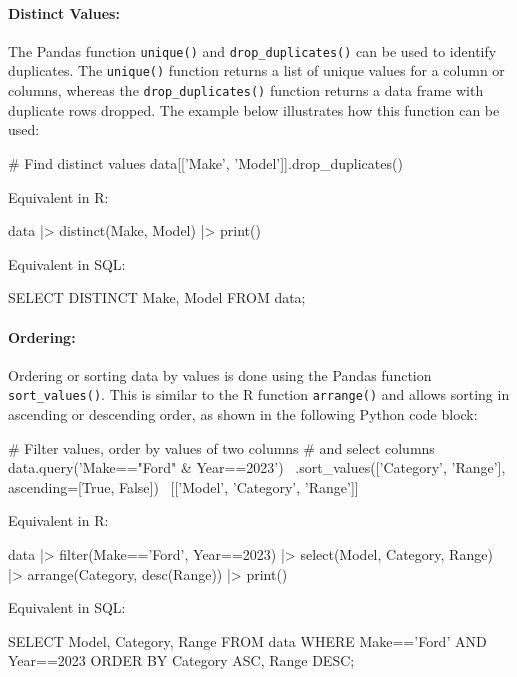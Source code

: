 \paragraph*{Distinct Values:} The Pandas function \texttt{unique()} and \texttt{drop\_duplicates()} can be used to identify duplicates. The \texttt{unique()} function returns a list of unique values for a column or columns, whereas the \texttt{drop\_duplicates()} function returns a data frame with duplicate rows dropped. The example below illustrates how this function can be used:

\begin{pythoncode}
# Find distinct values
data[['Make', 'Model']].drop_duplicates()
\end{pythoncode}

\begin{multicols}{2}

Equivalent in R:

\begin{Rcode}
data |> 
  distinct(Make, Model) |>
  print()
\end{Rcode}

Equivalent in SQL:

\begin{sqlcode}
SELECT DISTINCT Make, Model 
  FROM data;
\end{sqlcode}
\end{multicols}

\paragraph*{Ordering:} Ordering or sorting data by values is done using the Pandas function \texttt{sort\_values()}. This is similar to the R function \texttt{arrange()} and allows sorting in ascending or descending order, as shown in the following Python code block:

\begin{pythoncode}
# Filter values, order by values of two columns
# and select columns
data.query('Make=="Ford" & Year==2023') \
    .sort_values(['Category', 'Range'], ascending=[True, False]) \
    [['Model', 'Category', 'Range']]
\end{pythoncode}

\begin{multicols}{2}
Equivalent in R:
\begin{Rcode}
data |> 
  filter(Make=='Ford', 
         Year==2023) |> 
  select(Model, Category, 
         Range) |>
  arrange(Category, 
          desc(Range)) |>
  print()
\end{Rcode}

Equivalent in SQL:

\begin{sqlcode}
SELECT Model, Category, Range
   FROM data 
   WHERE Make=='Ford' AND 
         Year==2023
   ORDER BY Category ASC, 
            Range DESC;
\end{sqlcode}
\end{multicols}

